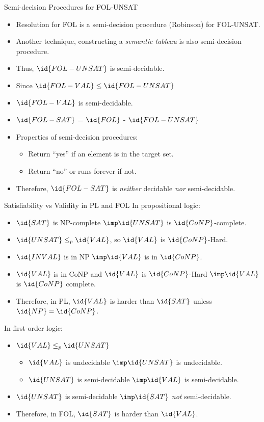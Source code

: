 \begin{wideslide}[bm=,toc=]{Semi-decision Procedures for FOL-UNSAT}
\begin{itemize}
\item<2-> Resolution for FOL is a semi-decision procedure (Robinson) for FOL-UNSAT.
\item<3-> Another technique, constructing a \emph{semantic tableau} is also
semi-decision procedure.
\item<4-> Thus, $\id{FOL-UNSAT}$ is semi-decidable.
\item<5-> Since $\id{FOL-VAL} \leq \id{FOL-UNSAT}$ 
\item<6-> $\id{FOL-VAL}$ is semi-decidable. 
\end{itemize}
\begin{itemize}
\item<8-> $\id{FOL-SAT}$ = $\id{FOL}$ - $\id{FOL-UNSAT}$
\item<9-> Properties of semi-decision procedures:
\begin{itemize}
\item<10-> Return ``yes'' if an element is in the target set.
\item<11-> Return ``no'' or runs forever if not.
\end{itemize}
\item<12->  Therefore, $\id{FOL-SAT}$ is \emph{neither} decidable \emph{nor}
semi-decidable.
\end{itemize}

\end{wideslide}

\begin{wideslide}[bm=,toc=]{Satisfiability vs Validity in PL and FOL}
In propositional logic:
\begin{itemize}
\item<2-> $\id{SAT}$ is NP-complete $\imp \id{UNSAT}$ is $\id{CoNP}$-complete. 
\item<3-> $\id{UNSAT} \leq_p \id{VAL}$, so $\id{VAL}$ is $\id{CoNP}$-Hard.
\item<4-> $\id{INVAL}$ is in NP $\imp \id{VAL}$ is in $\id{CoNP}$.
\item<5-> $\id{VAL}$ is in CoNP and $\id{VAL}$ is $\id{CoNP}$-Hard $\imp \id{VAL}$ is $\id{CoNP}$
complete.
\item<6-> Therefore, in PL, $\id{VAL}$ is harder than $\id{SAT}$ unless $\id{NP} = \id{CoNP}$.
\end{itemize}
In first-order logic:
\begin{itemize}
\item<7-> $\id{VAL} \leq_p \id{UNSAT}$
\begin{itemize}
\item<8-> $\id{VAL}$ is undecidable $\imp \id{UNSAT}$ is undecidable. 
\item<9-> $\id{UNSAT}$ is semi-decidable $\imp \id{VAL}$ is semi-decidable. 
\end{itemize}
\item<10-> $\id{UNSAT}$ is semi-decidable $\imp \id{SAT}$ \emph{not} semi-decidable. 
\item<11-> Therefore, in FOL, $\id{SAT}$ is harder than $\id{VAL}$.
\end{itemize}
\end{wideslide}


